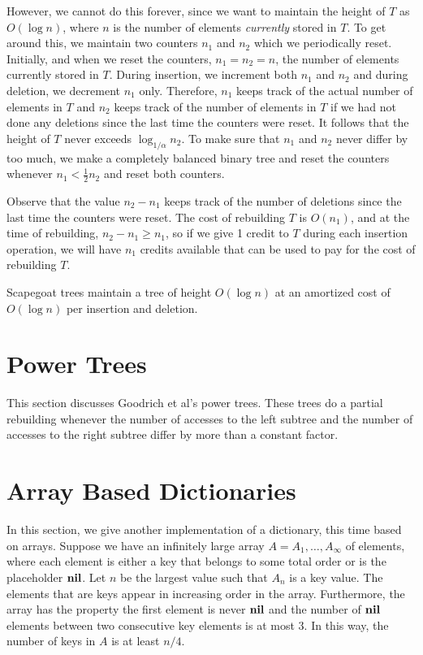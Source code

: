 However, we cannot do this forever, since we want to maintain the
height of $T$ as $O(\log n)$, where $n$ is the number of elements
\emph{currently} stored in $T$.  To get around this, we maintain two
counters $n_1$ and $n_2$ which we periodically reset.  Initially, and
when we reset the counters, $n_1=n_2=n$, the number of elements
currently stored in $T$.  During insertion, we increment both $n_1$
and $n_2$ and during deletion, we decrement $n_1$ only.  Therefore,
$n_1$ keeps track of the actual number of elements in $T$ and $n_2$
keeps track of the number of elements in $T$ if we had not done any
deletions since the last time the counters were reset.  It follows that the height of $T$ never
exceeds $\log_{1/\alpha} n_2$.  To make sure that $n_1$ and $n_2$
never differ by too much, we make a completely balanced binary tree
and reset the counters whenever $n_1 < \frac{1}{2} n_2$ and reset both
counters.  

Observe that the value $n_2-n_1$ keeps track of the number of
deletions since the last time the counters were reset.  The cost of
rebuilding $T$ is $O(n_1)$, and at the time of rebuilding, $n_2-n_1\ge
n_1$, so if we give 1 credit to $T$ during each insertion operation,
we will have $n_1$ credits available that can be used to pay for the
cost of rebuilding $T$.

\begin{thm}
Scapegoat trees maintain a tree of height $O(\log n)$ at an amortized
cost of $O(\log n)$ per insertion and deletion.
\end{thm}

\section{Power Trees}

This section discusses Goodrich et al's power trees.  These trees do a
partial rebuilding whenever the number of accesses to the left subtree and
the number of accesses to the right subtree differ by more than a constant
factor.

\section{Array Based Dictionaries}

In this section, we give another implementation of a dictionary, this
time based on arrays.  Suppose we have an infinitely large array
$A=A_1,\ldots,A_\infty$ of elements, where each element is either a
key that belongs to some total order or is the placeholder $\mathbf{nil}$.
Let $n$ be the largest value such that $A_n$ is a key value.  The
elements that are keys appear in increasing order in the array.
Furthermore, the array has the property the first element is never
$\mathbf{nil}$ and the number of $\mathbf{nil}$ elements between two consecutive key
elements is at most $3$.  In this way, the number of keys in $A$ is at
least $n/4$.

